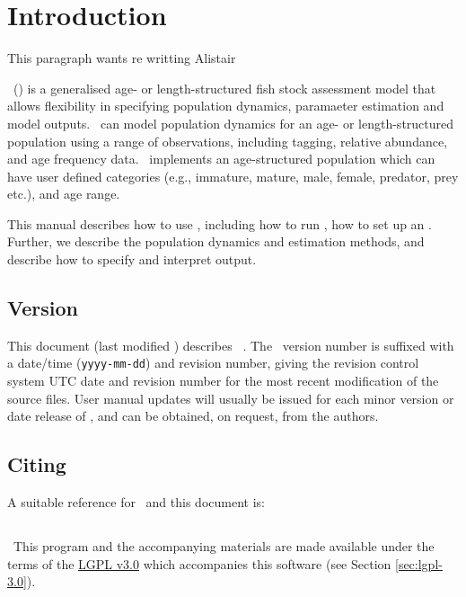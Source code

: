 \section{Introduction\label{sec:Introduction}}

\KL This paragraph wants re writting Alistair \KLend

\CNAME\ (\cname) is a generalised age- or length-structured fish stock assessment model that allows flexibility in specifying population dynamics, paramaeter estimation and model outputs. \CNAME\ can model population dynamics for an age- or length-structured population using a range of observations, including tagging, relative abundance, and age frequency data. \CNAME\ implements an age-structured population which can have user defined categories (e.g., immature, mature, male, female, predator, prey etc.), and age range. 

This manual describes how to use \CNAME, including how to run \CNAME, how to set up an \config. Further, we describe the population dynamics and estimation methods, and describe how to specify and interpret output. 

\subsection{Version\label{sec:version}}
This document (last modified \DocVer) describes \CNAME\ \VER. The \CNAME\ version number is suffixed with a date/time (\texttt{yyyy-mm-dd}) and revision number, giving the revision control system UTC date and revision number for the most recent modification of the source files. User manual updates will usually be issued for each minor version or date release of \CNAME, and can be obtained, on request, from the authors.

\subsection{Citing \CNAME}
A suitable reference for \CNAME\ and this document is:

\ManualRef{}

\subsection{}
\
This program and the accompanying materials are made available under the terms of the \href{http://choosealicense.com/licenses/lgpl-3.0/}{LGPL v3.0} which accompanies this software (see Section \ref{sec:lgpl-3.0}).

